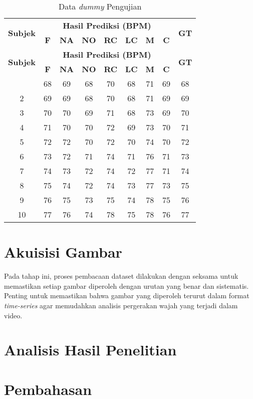 \begin{longtable}{|c|c|c|c|c|c|c|c|c|}
	\caption{Data \textit{dummy} Pengujian}
	\label{table:3.dummy}\\
	\hline
	\multirow{2}{*}{\textbf{Subjek}} & \multicolumn{7}{|c|}{\textbf{Hasil Prediksi (BPM)}} & \multirow{2}{*}{\textbf{GT}} \\ \cline{2-8}
	& \textbf{F} & \textbf{NA} & \textbf{NO} & \textbf{RC} & \textbf{LC} & \textbf{M} & \textbf{C} & \\ 
	\hline
	\endfirsthead
	\hline
	\multirow{2}{*}{\textbf{Subjek}} & \multicolumn{7}{|c|}{\textbf{Hasil Prediksi (BPM)}} & \multirow{2}{*}{\textbf{GT}} \\ \cline{2-8}
	& \textbf{F} & \textbf{NA} & \textbf{NO} & \textbf{RC} & \textbf{LC} & \textbf{M} & \textbf{C} & \\ 
	\hline
	\endhead
	\hline
	\endfoot
	\hline
	\endlastfoot
	1 & 68 & 69 & 68 & 70 & 68 & 71 & 69 & 68 \\ 
	\hline
	2 & 69 & 69 & 68 & 70 & 68 & 71 & 69 & 69 \\
	\hline
	3 & 70 & 70 & 69 & 71 & 68 & 73 & 69 & 70\\
	\hline
	4 & 71 & 70 & 70 & 72 & 69 & 73 & 70 & 71 \\
	\hline
	5 & 72 & 72 & 70 & 72 & 70 & 74 & 70 & 72 \\
	\hline
	6 & 73 & 72 & 71 & 74 & 71 & 76 & 71 & 73 \\ 
	\hline
	7 & 74 & 73 & 72 & 74 & 72 & 77 & 71 & 74 \\
	\hline
	8 & 75 & 74 & 72 & 74 & 73 & 77 & 73 & 75\\
	\hline
	9 & 76 & 75 & 73 & 75 & 74 & 78 & 75 & 76 \\
	\hline
	10 & 77 & 76 & 74 & 78 & 75 & 78 & 76 & 77
\end{longtable}


\section{Akuisisi Gambar} \label{IV.Akuisisi}
Pada tahap ini, proses pembacaan dataset dilakukan dengan seksama untuk memastikan setiap gambar diperoleh dengan urutan yang benar dan sistematis. Penting untuk memastikan bahwa gambar yang diperoleh terurut dalam format \textit{time-series} agar memudahkan analisis pergerakan wajah yang terjadi dalam video. 


\section{Analisis Hasil Penelitian} \label{IV.Analisis}
\lipsum[1-2] %


\section{Pembahasan} \label{IV.Bahas}
\lipsum[1-2] %